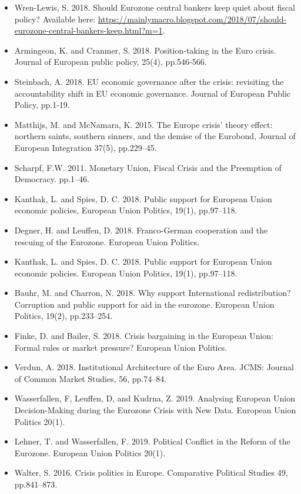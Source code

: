 \begin{itemize}
	\item Wren-Lewis, S. 2018. Should Eurozone central bankers keep quiet about fiscal policy? Available here: \url{https://mainlymacro.blogspot.com/2018/07/should-eurozone-central-bankers-keep.html?m=1}.
	\item Armingeon, K. and Cranmer, S. 2018. Position-taking in the Euro crisis. Journal of European public policy, 25(4), pp.546-566.
	\item Steinbach, A. 2018. EU economic governance after the crisis: revisiting the accountability shift in EU economic governance. Journal of European Public Policy, pp.1-19.
	\item Matthijs, M. and McNamara, K. 2015. The Europe crisis’ theory effect: northern saints, southern sinners, and the demise of the Eurobond, Journal of European Integration 37(5), pp.229–45.
	\item Scharpf, F.W. 2011. Monetary Union, Fiscal Crisis and the Preemption of Democracy. pp.1–46.
	\item Kanthak, L. and Spies, D. C. 2018. Public support for European Union economic policies, European Union Politics, 19(1), pp.97–118.
	\item Degner, H. and Leuffen, D. 2018. Franco-German cooperation and the rescuing of the Eurozone. European Union Politics.
	\item Kanthak, L. and Spies, D. C. 2018. Public support for European Union economic policies. European Union Politics, 19(1), pp.97–118.
	\item Bauhr, M. and Charron, N. 2018. Why support International redistribution? Corruption and public support for aid in the eurozone. European Union Politics, 19(2), pp.233–254.
	\item Finke, D. and Bailer, S. 2018. Crisis bargaining in the European Union: Formal rules or market pressure? European Union Politics.
	\item Verdun, A. 2018. Institutional Architecture of the Euro Area. JCMS: Journal of Common Market Studies, 56, pp.74–84.
	\item Wasserfallen, F, Leuffen, D, and Kudrna, Z. 2019. Analysing European Union Decision-Making during the Eurozone Crisis with New Data. European Union Politics 20(1).
	\item Lehner, T. and Wasserfallen, F. 2019. Political Conflict in the Reform of the Eurozone. European Union Politics 20(1).
	\item Walter, S. 2016. Crisis politics in Europe. Comparative Political Studies 49, pp.841–873.

\end{itemize}
